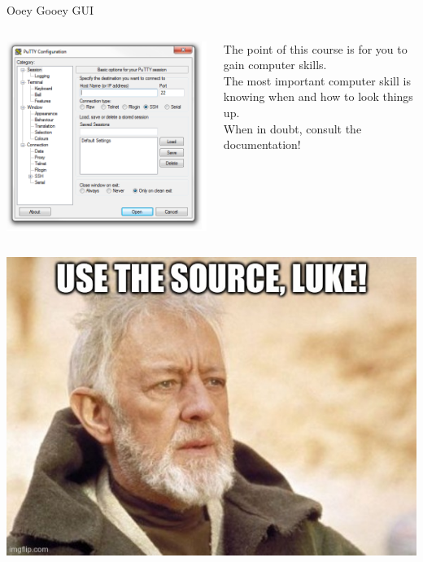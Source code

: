 \documentclass[11pt]{beamer}
\begin{document}
\begin{frame}{Ooey Gooey GUI}
\begin{columns}
\begin{column}{0.6\textwidth}
\includegraphics[scale=0.4]{putty.png}
\end{column}
\begin{column}{0.38\textwidth}
The point of this course is for you to gain computer skills. \\ 
\vspace{0.5em}
The most important computer skill is knowing when and how to look things up. \\
\vspace{0.5em}
When in doubt, consult the documentation! 
\end{column}
\end{columns}
\end{frame}

\begin{frame}
\center
\includegraphics[scale=0.46]{obiwan.jpg}
\end{frame}
\end{document}
